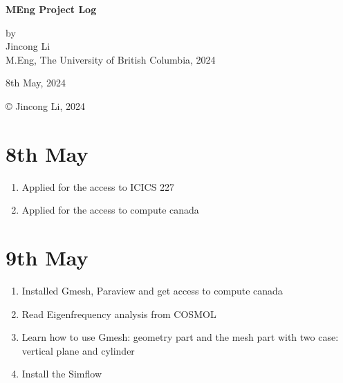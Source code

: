 \documentclass[12pt]{article} %
\begin{document}
\setlength{\parskip}{1em} 
\setlength{\parindent}{0pt}
\newcommand{\vect}[1]{\mathbf{#1}}

\begin{titlepage}  %
    \centering    %

    \vspace*{2cm}
    
    \normalsize \textbf{MEng Project Log} \\
    \vspace{0.5cm}  %
    \vspace{2cm}  %
    
    \normalsize by\\
    \vspace{1cm}
    \normalsize Jincong Li \\ 
    \vspace{1cm}
    \normalsize M.Eng, The University of British Columbia, 2024
    \vspace{11cm}  %
    
    \normalsize 8th May, 2024

    \vfill  %
    © Jincong Li, 2024
\end{titlepage}
\tableofcontents
\newpage
\section{8th May}
\begin{enumerate}
    \item Applied for the access to ICICS 227
    \item Applied for the access to compute canada
\end{enumerate}

\section{9th May}
\begin{enumerate}
    \item Installed Gmesh, Paraview and get access to compute canada
    \item Read Eigenfrequency analysis from COSMOL 
    \item Learn how to use Gmesh: geometry part and the mesh part with two case: vertical plane and cylinder
    \item Install the Simflow
\end{enumerate}
\end{document}

